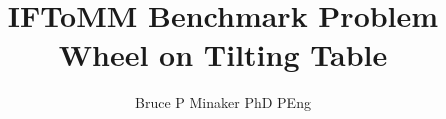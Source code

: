 \title{
IFToMM Benchmark Problem\\
Wheel on Tilting Table\\
}
\author{
Bruce P Minaker PhD PEng\\
}
